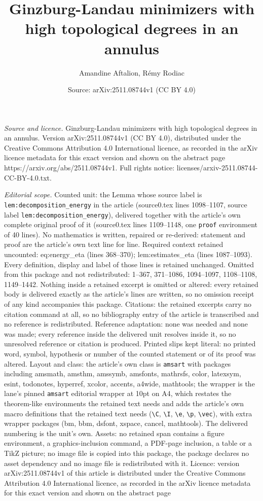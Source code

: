 \documentclass[10pt,a4paper]{amsart}
\title[Ginzburg-Landau minimizers with high topological degrees in ]{Ginzburg-Landau minimizers with high topological degrees in an annulus}
\author{Amandine Aftalion, R\'emy Rodiac}
\date{Source: arXiv:2511.08744v1 (CC BY 4.0)}
\begin{document}
\maketitle

\noindent\emph{Source and licence.} Ginzburg-Landau minimizers with high topological degrees in an annulus. Version arXiv:2511.08744v1 (CC BY 4.0), distributed under the Creative Commons Attribution 4.0 International licence, as recorded in the arXiv licence metadata for this exact version and shown on the abstract page https://arxiv.org/abs/2511.08744v1. Full rights notice: licenses/arxiv-2511.08744-CC-BY-4.0.txt.\par\smallskip

\noindent\textit{Editorial scope.} Counted unit: the Lemma whose source label is \texttt{lem:decomposition\_energy} in the article (source0.tex lines 1098--1107, source label \texttt{lem:decomposition\_energy}), delivered together with the article's own complete original proof of it (source0.tex lines 1109--1148, one \texttt{proof} environment of 40 lines). No mathematics is written, repaired or re-derived: statement and proof are the article's own text line for line. Required context retained uncounted: eq:energy\_eta (lines 368--370); lem:estimates\_eta (lines 1087--1093). Every definition, display and label of those lines is retained unchanged. Omitted from this package and not redistributed: 1--367, 371--1086, 1094--1097, 1108--1108, 1149--1442. Nothing inside a retained excerpt is omitted or altered: every retained body is delivered exactly as the article's lines are written, so no omission receipt of any kind accompanies this package. Citations: the retained excerpts carry no citation command at all, so no bibliography entry of the article is transcribed and no reference is redistributed. Reference adaptation: none was needed and none was made; every reference inside the delivered unit resolves inside it, so no unresolved reference or citation is produced. Printed slips kept literal: no printed word, symbol, hypothesis or number of the counted statement or of its proof was altered. Layout and class: the article's own class is \texttt{amsart} with packages including amsmath, amsthm, amssymb, amsfonts, mathrsfs, color, latexsym, esint, todonotes, hyperref, xcolor, accents, a4wide, mathtools; the wrapper is the lane's pinned \texttt{amsart} editorial wrapper at 10pt on A4, which restates the theorem-like environments the retained text needs and adds the article's own macro definitions that the retained text needs (\texttt{\textbackslash C}, \texttt{\textbackslash I}, \texttt{\textbackslash e}, \texttt{\textbackslash p}, \texttt{\textbackslash vec}), with extra wrapper packages (bm, bbm, dsfont, xspace, cancel, mathtools). The delivered numbering is the unit's own. Assets: no retained span contains a figure environment, a graphics-inclusion command, a PDF-page inclusion, a table or a TikZ picture; no image file is copied into this package, the package declares no asset dependency and no image file is redistributed with it. Licence: version arXiv:2511.08744v1 of this article is distributed under the Creative Commons Attribution 4.0 International licence, as recorded in the arXiv licence metadata for this exact version and shown on the abstract page 
\end{document}
